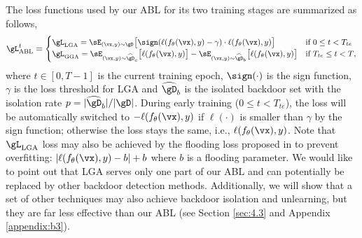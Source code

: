 The loss functions used by our ABL for its two training stages are summarized as follows,
\begin{equation}\label{eq:abl}
\small
    \gL^t_{\textup{ABL}} =
    \begin{cases}
      \gL_{\textup{LGA}} = \sE_{(\vx, y) \sim \gD} \big[\sign(\ell(f_{\theta}(\vx), y) - \gamma) \cdot \ell(f_{\theta}(\vx), y)\big] & \text{if  $0 \leq t < T_{te}$}\\
      \gL_{\textup{GGA}} = \sE_{(\vx, y) \sim \widehat{\gD}_c} \big[\ell(f_{\theta}(\vx), y)\big] - \sE_{(\vx, y) \sim \widehat{\gD}_b} \big[\ell(f_{\theta}(\vx), y)\big] & \text{if $T_{te} \leq t < T$},
    \end{cases}
\end{equation}
where $t \in [0, T-1]$ is the current training epoch, $\sign(\cdot)$ is the sign function, $\gamma$ is the loss threshold for LGA and $\widehat{\gD}_b$ is the isolated backdoor set with the isolation rate $p=|\widehat{\gD}_b|/|\gD|$. During early training ($0 \leq t < T_{te}$), the loss will be automatically switched to $- \ell(f_{\theta}(\vx), y)$ if $\ell(\cdot)$ is smaller than $\gamma$ by the sign function; otherwise the loss stays the same, i.e., $\ell(f_{\theta}(\vx), y)$. Note that $\gL_{\textup{LGA}}$ loss may also be achieved by the flooding loss proposed in \cite{ishida2020we} to prevent overfitting: $|\ell(f_{\theta}(\vx), y) - b| + b$ where $b$ is a flooding parameter. We would like to point out that LGA serves only one part of our ABL and can potentially be replaced by other backdoor detection methods. Additionally, we will show that a set of other techniques may also achieve backdoor isolation and unlearning, but they are far less effective than our ABL (see Section \ref{sec:4.3} and Appendix \ref{appendix:b3}).

